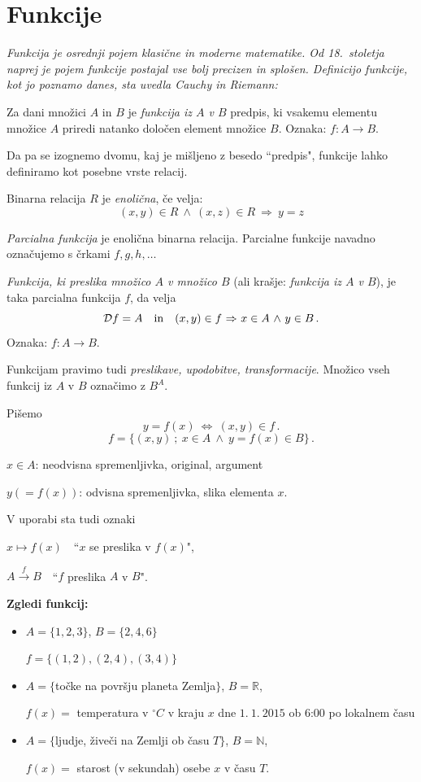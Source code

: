 \documentclass[11pt,paper=b5,footinclude,headinclude]{scrbook} %
\def\inn {{~\wedge~}}
\def\sledi {{~\Rightarrow~}}
\def\cee {{~\Leftrightarrow~}}
\begin{document}
\section{Funkcije}

{\em Funkcija je osrednji pojem klasične in moderne matematike. Od 18.~stoletja naprej
je pojem funkcije postajal vse bolj precizen in splošen. Definicijo funkcije, kot jo poznamo danes, sta uvedla Cauchy in Riemann:}

\medskip
Za dani množici $A$ in $B$ je {\em funkcija iz $A$ v $B$} predpis, ki vsakemu elementu množice $A$ priredi natanko določen element množice $B$.
Oznaka: $f:A\to B$.

\medskip
Da pa se izognemo dvomu, kaj je mišljeno z besedo ``predpis", funkcije lahko definiramo kot posebne vrste relacij.

\medskip
Binarna relacija $R$ je {\em enolična}, če velja:
$$(x,y)\in R \inn (x,z)\in R\sledi y = z$$

{\em Parcialna funkcija} je enolična binarna relacija. Parcialne funkcije navadno označujemo s črkami $f, g,h,\ldots$

\emph{ Funkcija, ki preslika množico $A$ v množico $B$} (ali krašje: {\em funkcija iz $A$ v $B$}), je taka parcialna funkcija $f$, da
velja
$${\cal D}f= A \textrm{~~~in~~~} (x,y)\in f\sledi x\in A\inn y\in B\,.$$
Oznaka: $f:A\to B$.

Funkcijam pravimo tudi {\em preslikave, upodobitve, transformacije}.
Množico vseh funkcij iz $A$ v $B$ označimo z $B^A$.

\bigskip

Pišemo
$$y=f(x)\cee (x,y)\in f\,.$$
$$f = \{(x,y)~;~x\in A\inn y = f(x)\in B\}\,.$$

$x\in A$: neodvisna spremenljivka, original, argument

$y (= f(x))$: odvisna spremenljivka, slika elementa $x$.

\medskip

V uporabi sta tudi oznaki

$x\mapsto f(x)$~~``$x$ se preslika v $f(x)$",

$A\overset{f}{\to} B$~~``$f$ preslika $A$ v $B$".

\bigskip
\textbf{ Zgledi funkcij:}
\begin{itemize}
  \item $A = \{1,2,3\}$, $B = \{2,4,6\}$

  $f = \{(1,2),(2,4),(3,4)\}$

  \item $A = \{$točke na površju planeta Zemlja$\}$, $B = \mathbb{R}$,

$f(x) = $ temperatura v $^\circ C$ v kraju $x$ dne $1.~1.~2015$ ob 6:00 po lokalnem času

  \item $A = \{$ljudje, živeči na Zemlji ob času $T\}$, $B = \mathbb{N}$,

$f(x) = $ starost (v sekundah) osebe $x$ v času $T$.
\end{itemize}
\end{document}
